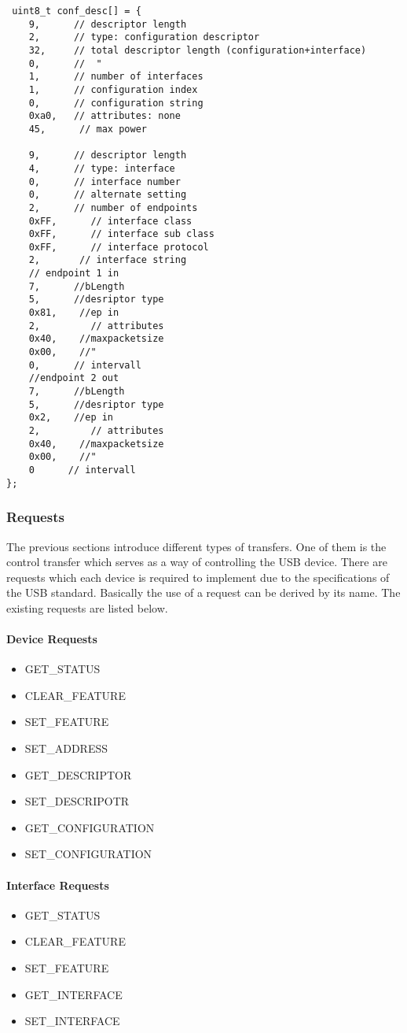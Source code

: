 \begin{verbatim}
 uint8_t conf_desc[] = {
	9,      // descriptor length
	2,      // type: configuration descriptor
	32,     // total descriptor length (configuration+interface)
	0,      //  "
	1,      // number of interfaces
	1,      // configuration index
	0,      // configuration string
	0xa0,   // attributes: none
	45,      // max power

	9,      // descriptor length
	4,      // type: interface
	0,      // interface number
	0,      // alternate setting
	2,      // number of endpoints
	0xFF,      // interface class
	0xFF,      // interface sub class
	0xFF,      // interface protocol
	2,       // interface string
	// endpoint 1 in
	7,      //bLength
	5,      //desriptor type
	0x81,    //ep in
	2,         // attributes
	0x40,    //maxpacketsize
	0x00,    //"
	0,      // intervall
	//endpoint 2 out
	7,      //bLength
	5,      //desriptor type
	0x2,    //ep in
	2,         // attributes
	0x40,    //maxpacketsize
	0x00,    //"
	0      // intervall
}; 
\end{verbatim}

\subsubsection{Requests}
The previous sections introduce different types of transfers. One of them is the control transfer which serves as a way of controlling 
the USB device. There are requests which each device is required to implement due to the specifications of the USB standard. Basically 
the use of a request can be derived by its name. The existing requests are listed below.

\paragraph{Device Requests}
\begin{itemize}
 \item GET\_STATUS
 \item CLEAR\_FEATURE
 \item SET\_FEATURE
 \item SET\_ADDRESS
 \item GET\_DESCRIPTOR
 \item SET\_DESCRIPOTR
 \item GET\_CONFIGURATION
 \item SET\_CONFIGURATION
\end{itemize}

\paragraph{Interface Requests}
\begin{itemize}
 \item GET\_STATUS
 \item CLEAR\_FEATURE
 \item SET\_FEATURE
 \item GET\_INTERFACE
 \item SET\_INTERFACE
\end{itemize}

